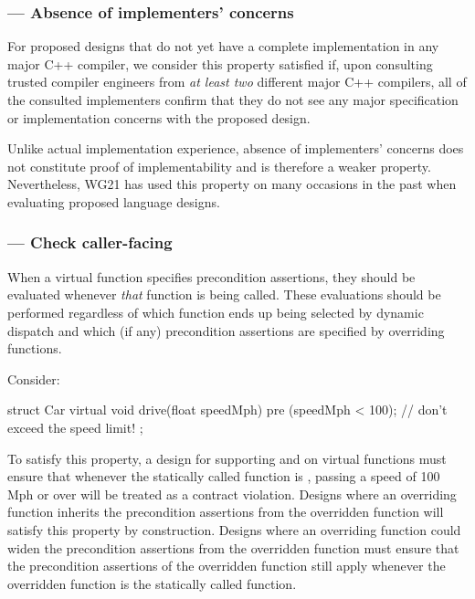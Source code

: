 \subsubsection{ --- Absence of implementers' concerns}

For proposed designs that do not yet have a complete implementation in any major C++ compiler, we consider this property satisfied if, upon consulting trusted compiler engineers from \emph{at least two} different major C++ compilers, all of the consulted implementers confirm that they do not see any major specification or implementation concerns with the proposed design. 

Unlike actual implementation experience, absence of implementers' concerns does not constitute proof of implementability and is therefore a weaker property. Nevertheless, WG21 has used this property on many occasions in the past when evaluating proposed language designs.


\subsubsection{ --- Check caller-facing }

When a virtual function specifies precondition assertions, they should be evaluated whenever \emph{that} function is being called. These evaluations should be performed regardless of which function ends up being selected by dynamic dispatch and which (if any) precondition assertions are specified by overriding functions.

Consider: %
\begin{codeblock}
struct Car {
  virtual void drive(float speedMph)
    pre (speedMph < 100); // don't exceed the speed limit!
};
\end{codeblock}
To satisfy this property, a design for supporting  and  on virtual functions must ensure that whenever the statically called function is , passing a speed of 100 Mph or over will be treated as a contract violation. Designs where an overriding function inherits the precondition assertions from the overridden function will satisfy this property by construction. Designs where an overriding function could widen the precondition assertions from the overridden function must ensure that the precondition assertions of the overridden function still apply whenever the overridden function is the statically called function.

